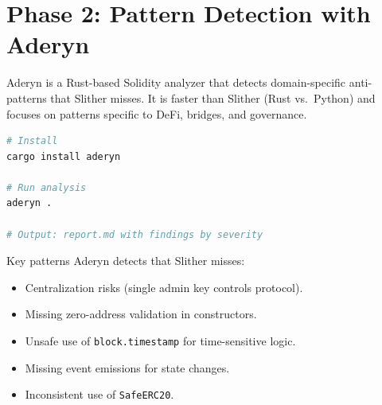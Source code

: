 \section{Phase 2: Pattern Detection with Aderyn}


Aderyn is a Rust-based Solidity analyzer that detects domain-specific anti-patterns
that Slither misses. It is faster than Slither (Rust vs.\ Python) and focuses on
patterns specific to DeFi, bridges, and governance.

\begin{lstlisting}[language=bash,caption={Running Aderyn}]
# Install
cargo install aderyn

# Run analysis
aderyn .

# Output: report.md with findings by severity
\end{lstlisting}

Key patterns Aderyn detects that Slither misses:
\begin{itemize}[nosep]
  \item Centralization risks (single admin key controls protocol).
  \item Missing zero-address validation in constructors.
  \item Unsafe use of \texttt{block.timestamp} for time-sensitive logic.
  \item Missing event emissions for state changes.
  \item Inconsistent use of \texttt{SafeERC20}.
\end{itemize}

